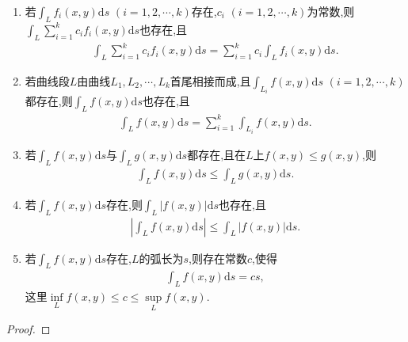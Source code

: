 \documentclass[../../main.tex]{subfiles}%
\begin{document}
\begin{theorem}
\begin{enumerate}[(1)]
\item 若$\int_L f_i(x,y)\mathrm{d}s$ $(i=1,2,\cdots,k)$存在,$c_i$ $(i=1,2,\cdots,k)$为常数,则$\int_L \sum\limits_{i=1}^k c_i f_i(x,y)\mathrm{d}s$也存在,且
\begin{align*}
\int_L \sum\limits_{i=1}^k c_i f_i(x,y)\mathrm{d}s = \sum\limits_{i=1}^k c_i \int_L f_i(x,y)\mathrm{d}s.
\end{align*}

\item 若曲线段$L$由曲线$L_1,L_2,\cdots,L_k$首尾相接而成,且$\int_{L_i} f(x,y)\mathrm{d}s$ $(i=1,2,\cdots,k)$都存在,则$\int_L f(x,y)\mathrm{d}s$也存在,且
\begin{align*}
\int_L f(x,y)\mathrm{d}s = \sum\limits_{i=1}^k \int_{L_i} f(x,y)\mathrm{d}s.
\end{align*}

\item 若$\int_L f(x,y)\mathrm{d}s$与$\int_L g(x,y)\mathrm{d}s$都存在,且在$L$上$f(x,y) \leqslant g(x,y)$,则
\begin{align*}
\int_L f(x,y)\mathrm{d}s \leqslant \int_L g(x,y)\mathrm{d}s.
\end{align*}

\item 若$\int_L f(x,y)\mathrm{d}s$存在,则$\int_L |f(x,y)|\mathrm{d}s$也存在,且
\begin{align*}
\left| \int_L f(x,y)\mathrm{d}s \right| \leqslant \int_L |f(x,y)|\mathrm{d}s.
\end{align*}

\item 若$\int_L f(x,y)\mathrm{d}s$存在,$L$的弧长为$s$,则存在常数$c$,使得
\begin{align*}
\int_L f(x,y)\mathrm{d}s = cs,
\end{align*}
这里$\inf\limits_L f(x,y) \leqslant c \leqslant \sup\limits_L f(x,y)$.
\end{enumerate}
\end{theorem}
\begin{proof}



\end{proof}
\end{document}
